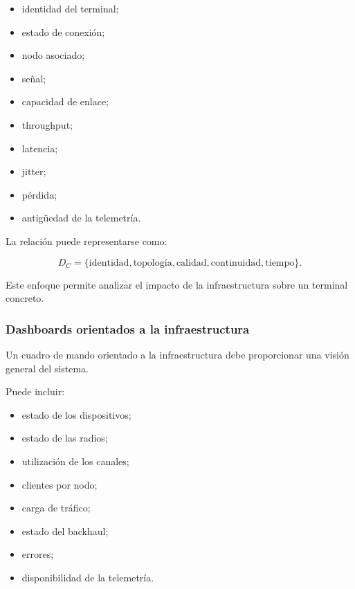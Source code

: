 \begin{itemize}
    \item identidad del terminal;

    \item estado de conexión;

    \item nodo asociado;

    \item señal;

    \item capacidad de enlace;

    \item throughput;

    \item latencia;

    \item jitter;

    \item pérdida;

    \item antigüedad de la telemetría.
\end{itemize}

La relación puede representarse como:

\[
    D_C
    =
    \{
        \text{identidad},
        \text{topología},
        \text{calidad},
        \text{continuidad},
        \text{tiempo}
    \}.
\]

Este enfoque permite analizar el impacto de la infraestructura sobre un
terminal concreto.


\subsubsection*{Dashboards orientados a la infraestructura}

Un cuadro de mando orientado a la infraestructura debe proporcionar una
visión general del sistema.

Puede incluir:

\begin{itemize}
    \item estado de los dispositivos;

    \item estado de las radios;

    \item utilización de los canales;

    \item clientes por nodo;

    \item carga de tráfico;

    \item estado del backhaul;

    \item errores;

    \item disponibilidad de la telemetría.
\end{itemize}

